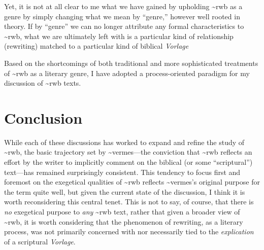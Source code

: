 Yet, it is not at all clear to me what we have gained by upholding
\textasciitilde{}rwb as a genre by simply changing what we mean by
``genre,'' however well rooted in theory.\autocite[Machiela critiques
Zahn's approach for similar reasons. See][]{machiela_jjs2010} If by
``genre'' we can no longer attribute any formal characteristics to
\textasciitilde{}rwb, what we are ultimately left with is a particular
kind of relationship (rewriting) matched to a particular kind of
biblical \emph{Vorlage}

Based on the shortcomings of both traditional and more sophisticated
treatments of \textasciitilde{}rwb as a literary genre, I have adopted a
process-oriented paradigm for my discussion of \textasciitilde{}rwb
texts.\autocite[I am in broad agreement with Campbell's treatment of the
matter. See][64--67]{campbell_zsengeller2014}

\hypertarget{conclusion}{%
\section{Conclusion}\label{conclusion}}

While each of these discussions has worked to expand and refine the
study of \textasciitilde{}rwb, the basic trajectory set by
\textasciitilde{}vermes---the conviction that \textasciitilde{}rwb
reflects an effort by the writer to implicitly comment on the biblical
(or some ``scriptural'') text---has remained surprisingly consistent.
This tendency to focus first and foremost on the exegetical qualities of
\textasciitilde{}rwb reflects \textasciitilde{}vermes's original purpose
for the term quite well, but given the current state of the discussion,
I think it is worth reconsidering this central tenet. This is not to
say, of course, that there is \emph{no} exegetical purpose to \emph{any}
\textasciitilde{}rwb text, rather that given a broader view of
\textasciitilde{}rwb, it is worth considering that the phenomenon of
rewriting, as a literary process, was not primarily concerned with nor
necessarily tied to the \emph{explication} of a scriptural
\emph{Vorlage}.

